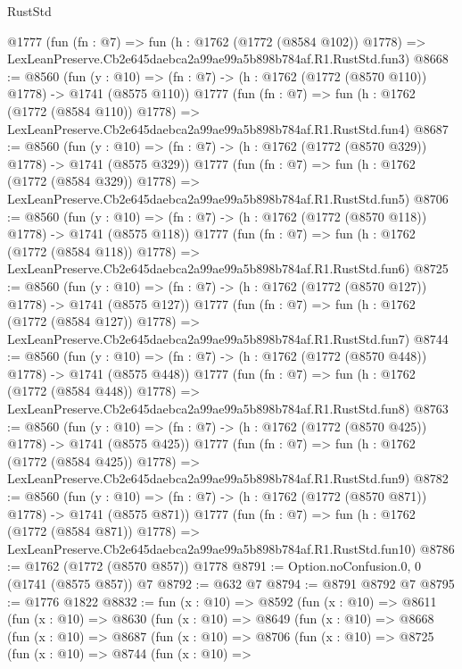 \begin{lexlean}{RustStd}
\begin{coremodule}
    @1777
    (fun (fn : @7) =>
    fun (h : @1762 (@1772 (@8584 @102)) @1778) =>
    LexLeanPreserve.Cb2e645daebca2a99ae99a5b898b784af.R1.RustStd.fun3)
@8668 := @8560
    (fun (y : @10) => (fn : @7) -> (h : @1762 (@1772 (@8570 @110)) @1778) -> @1741 (@8575 @110))
    @1777
    (fun (fn : @7) =>
    fun (h : @1762 (@1772 (@8584 @110)) @1778) =>
    LexLeanPreserve.Cb2e645daebca2a99ae99a5b898b784af.R1.RustStd.fun4)
@8687 := @8560
    (fun (y : @10) => (fn : @7) -> (h : @1762 (@1772 (@8570 @329)) @1778) -> @1741 (@8575 @329))
    @1777
    (fun (fn : @7) =>
    fun (h : @1762 (@1772 (@8584 @329)) @1778) =>
    LexLeanPreserve.Cb2e645daebca2a99ae99a5b898b784af.R1.RustStd.fun5)
@8706 := @8560
    (fun (y : @10) => (fn : @7) -> (h : @1762 (@1772 (@8570 @118)) @1778) -> @1741 (@8575 @118))
    @1777
    (fun (fn : @7) =>
    fun (h : @1762 (@1772 (@8584 @118)) @1778) =>
    LexLeanPreserve.Cb2e645daebca2a99ae99a5b898b784af.R1.RustStd.fun6)
@8725 := @8560
    (fun (y : @10) => (fn : @7) -> (h : @1762 (@1772 (@8570 @127)) @1778) -> @1741 (@8575 @127))
    @1777
    (fun (fn : @7) =>
    fun (h : @1762 (@1772 (@8584 @127)) @1778) =>
    LexLeanPreserve.Cb2e645daebca2a99ae99a5b898b784af.R1.RustStd.fun7)
@8744 := @8560
    (fun (y : @10) => (fn : @7) -> (h : @1762 (@1772 (@8570 @448)) @1778) -> @1741 (@8575 @448))
    @1777
    (fun (fn : @7) =>
    fun (h : @1762 (@1772 (@8584 @448)) @1778) =>
    LexLeanPreserve.Cb2e645daebca2a99ae99a5b898b784af.R1.RustStd.fun8)
@8763 := @8560
    (fun (y : @10) => (fn : @7) -> (h : @1762 (@1772 (@8570 @425)) @1778) -> @1741 (@8575 @425))
    @1777
    (fun (fn : @7) =>
    fun (h : @1762 (@1772 (@8584 @425)) @1778) =>
    LexLeanPreserve.Cb2e645daebca2a99ae99a5b898b784af.R1.RustStd.fun9)
@8782 := @8560
    (fun (y : @10) => (fn : @7) -> (h : @1762 (@1772 (@8570 @871)) @1778) -> @1741 (@8575 @871))
    @1777
    (fun (fn : @7) =>
    fun (h : @1762 (@1772 (@8584 @871)) @1778) =>
    LexLeanPreserve.Cb2e645daebca2a99ae99a5b898b784af.R1.RustStd.fun10)
@8786 := @1762 (@1772 (@8570 @857)) @1778
@8791 := Option.noConfusion.{0, 0} (@1741 (@8575 @857)) @7
@8792 := @632 @7
@8794 := @8791 @8792 @7
@8795 := @1776 @1822
@8832 := fun (x : @10) =>
  @8592
    (fun (x : @10) =>
    @8611
      (fun (x : @10) =>
      @8630
        (fun (x : @10) =>
        @8649
          (fun (x : @10) =>
          @8668
            (fun (x : @10) =>
            @8687
              (fun (x : @10) =>
              @8706
                (fun (x : @10) =>
                @8725
                  (fun (x : @10) =>
                  @8744
                    (fun (x : @10) =>

\end{coremodule}
\end{lexlean}
